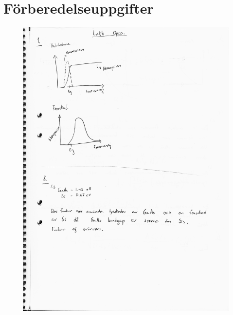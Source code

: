 \documentclass[a4paper]{article}
\begin{document}
\section{Förberedelseuppgifter}
\begin{figure}[H]
\centering
\includegraphics[scale=.7]{frb1.jpeg}
\end{figure}
\newpage
\end{document}
